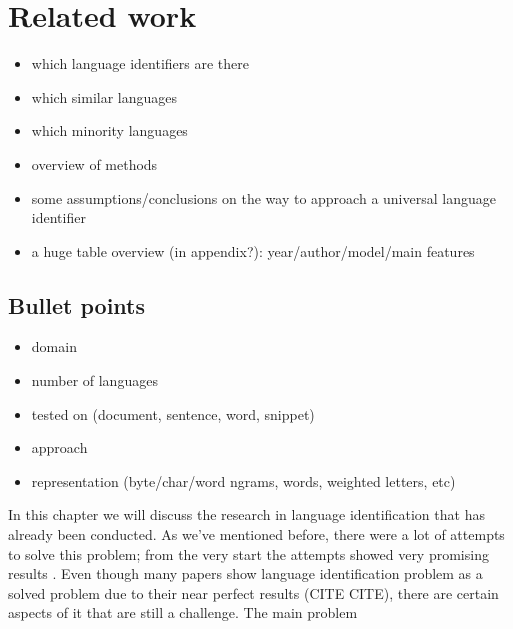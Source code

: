 \chapter{Related work}

\begin{itemize}
    \item which language identifiers are there
    \item which similar languages
    \item which minority languages
    \item overview of methods
    \item some assumptions/conclusions on the way to approach a universal language identifier
    \item a huge table overview (in appendix?): year/author/model/main features
\end{itemize}

\section{Bullet points}



\begin{itemize}
    \item domain
    \item number of languages
    \item tested on (document, sentence, word, snippet)
    \item approach
    \item representation (byte/char/word ngrams, words, weighted letters, etc)
\end{itemize}

In this chapter we will discuss the research in language identification that has already been conducted. As we've mentioned before, there were a lot of attempts to solve this problem; from the very start the attempts showed very promising results \parencite{cavnar1994n,dunning1994statistical}. Even though many papers show language identification problem as a solved problem due to their near perfect results (CITE CITE), there are certain aspects of it that are still a challenge. The main problem 





